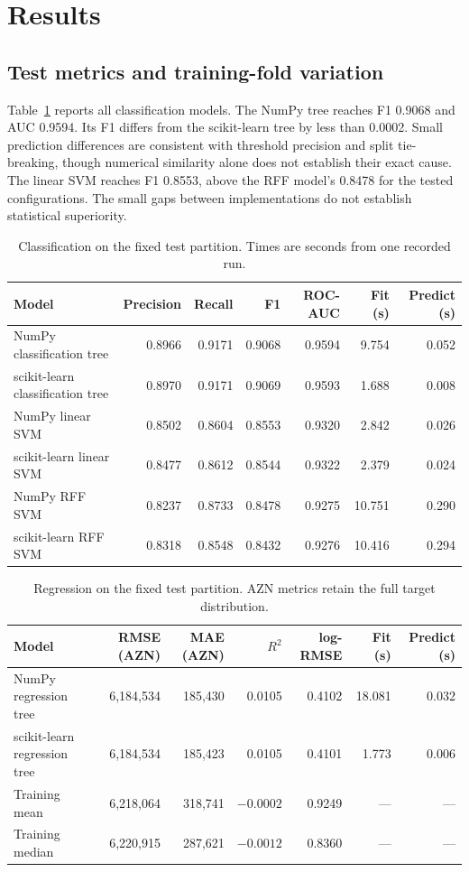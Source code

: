 \documentclass[10pt,twocolumn,a4paper]{article}
\begin{document}
\section{Results}
\subsection{Test metrics and training-fold variation}
Table~\ref{tab:classification} reports all classification models. The NumPy tree reaches F1 0.9068 and AUC 0.9594. Its F1 differs from the scikit-learn tree by less than 0.0002. Small prediction differences are consistent with threshold precision and split tie-breaking, though numerical similarity alone does not establish their exact cause. The linear SVM reaches F1 0.8553, above the RFF model's 0.8478 for the tested configurations. The small gaps between implementations do not establish statistical superiority.

\begin{table}[t]\centering\small
\caption{Classification on the fixed test partition. Times are seconds from one recorded run.}\label{tab:classification}
\begin{tabular}{@{}lrrrrrr@{}}\toprule
Model & Precision & Recall & F1 & ROC-AUC & Fit (s) & Predict (s)\\\midrule
NumPy classification tree & 0.8966 & 0.9171 & 0.9068 & 0.9594 & 9.754 & 0.052\\
scikit-learn classification tree & 0.8970 & 0.9171 & 0.9069 & 0.9593 & 1.688 & 0.008\\
NumPy linear SVM & 0.8502 & 0.8604 & 0.8553 & 0.9320 & 2.842 & 0.026\\
scikit-learn linear SVM & 0.8477 & 0.8612 & 0.8544 & 0.9322 & 2.379 & 0.024\\
NumPy RFF SVM & 0.8237 & 0.8733 & 0.8478 & 0.9275 & 10.751 & 0.290\\
scikit-learn RFF SVM & 0.8318 & 0.8548 & 0.8432 & 0.9276 & 10.416 & 0.294\\
\bottomrule\end{tabular}
\end{table}

\begin{table}[t]\centering\small
\caption{Regression on the fixed test partition. AZN metrics retain the full target distribution.}\label{tab:regression}
\begin{tabular}{@{}lrrrrrr@{}}\toprule
Model & RMSE (AZN) & MAE (AZN) & $R^2$ & log-RMSE & Fit (s) & Predict (s)\\\midrule
NumPy regression tree & 6,184,534 & 185,430 & 0.0105 & 0.4102 & 18.081 & 0.032\\
scikit-learn regression tree & 6,184,534 & 185,423 & 0.0105 & 0.4101 & 1.773 & 0.006\\
Training mean & 6,218,064 & 318,741 & $-0.0002$ & 0.9249 & --- & ---\\
Training median & 6,220,915 & 287,621 & $-0.0012$ & 0.8360 & --- & ---\\
\bottomrule\end{tabular}
\end{table}
\end{document}
